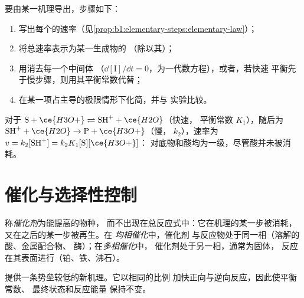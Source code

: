 \begin{method}[由机理导出速率方程]\label{met:b1:elementary-steps:rate-law}
要由某一机理导出，步骤如下：
\begin{enumerate}
  \item 写出每个的速率（见\cref{prop:b1:elementary-steps:elementary-law}）；
  \item 将总速率表示为某一生成物的
        （除以其）；
  \item 用消去每一个中间体
        （$\dd[\mathrm{I}]/\dd t = 0$，为一代数方程），或者，若快速
        平衡先于慢步骤，则用其平衡常数代替；
  \item 在某一项占主导的极限情形下化简，并与
        实验比较。
\end{enumerate}
\end{method}

\begin{example}[酸催化反应]\label{ex:b1:elementary-steps:acid}
对于 $\mathrm{S} + \ce{H3O+} \rightleftharpoons \mathrm{SH}^+ + \ce{H2O}$（快速，
平衡常数 $K_1$），随后为 $\mathrm{SH}^+ + \ce{H2O} \to \mathrm{P} + \ce{H3O+}$（慢，
 $k_2$），速率为 $v = k_2[\mathrm{SH}^+] = k_2K_1[\mathrm{S}][\ce{H3O+}]$：
对底物和酸均为一级，尽管酸并未被消耗。
\end{example}

\section{催化与选择性控制}

\begin{definition}\label{def:b1:elementary-steps:catalyst}
称\emph{催化剂}为能提高的物种，
而不出现在总反应式中：它在机理的某一步被消耗，
又在之后的某一步被再生。在
\emph{均相催化}中，催化剂
与反应物处于同一相（溶解的酸、金属配合物、
酶）；在\emph{多相催化}中，
催化剂处于另一相，通常为固体，
反应在其表面进行（铂、铁、沸石）。
\end{definition}

\begin{proposition}[催化剂改变什么]\label{prop:b1:elementary-steps:catalysis}
提供一条势垒较低的新机理。它以相同的比例
加快正向与逆向反应，因此使平衡常数、
最终状态和反应能量
保持不变。
\end{proposition}

